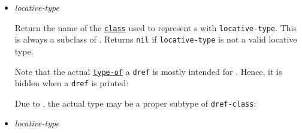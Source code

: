 \begin{itemize}
\item
  \label{x-28DREF-EXT-3ADREF-CLASS-20FUNCTION-29}
  \emph{locative-type}

  Return the name of the
  \href{http://www.lispworks.com/documentation/HyperSpec/Body/t_class.htm}{\texttt{class}}
  used to represent
  s
  with \texttt{locative-type}. This is always a subclass of
  . Returns
  \texttt{nil} if \texttt{locative-type} is not a valid locative type.

  Note that the actual
  \href{http://www.lispworks.com/documentation/HyperSpec/Body/f_tp_of.htm}{\texttt{type-of}}
  a \texttt{dref} is mostly intended for
  . Hence, it is hidden when a \texttt{dref} is printed:

\begin{Shaded}
\begin{Highlighting}[]
 \NormalTok{)}
\NormalTok{(} \OperatorTok{*}\NormalTok{)}
\OperatorTok{=\textgreater{}}
\end{Highlighting}
\end{Shaded}

  Due to
  ,
  the actual type may be a proper subtype of \texttt{dref-class}:

\begin{Shaded}
\begin{Highlighting}[]
 \NormalTok{)}
\NormalTok{(} \OperatorTok{*}\NormalTok{)}
\OperatorTok{=\textgreater{}}
\NormalTok{(}  \NormalTok{)}
\OperatorTok{=\textgreater{}}
\OperatorTok{=\textgreater{}}
\end{Highlighting}
\end{Shaded}
\item
  \label{x-28DREF-EXT-3ALOCATIVE-TYPE-DIRECT-SUPERS-20FUNCTION-29}
  \emph{locative-type}


\end{itemize}
